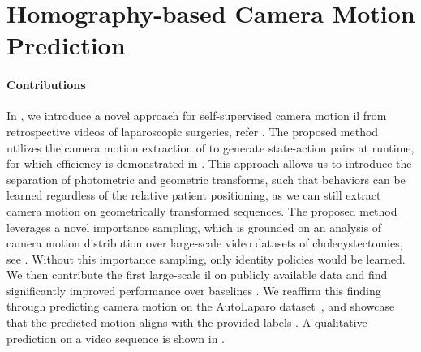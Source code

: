 \section{Homography-based Camera Motion Prediction}
\label{con:sec:hom_pred}
\paragraph{Contributions} In , we introduce a novel approach for self-supervised camera motion \gls{il} from retrospective videos of laparoscopic surgeries, refer . The proposed method utilizes the camera motion extraction of  to generate state-action pairs at runtime, for which efficiency is demonstrated in . This approach allows us to introduce the separation of photometric and geometric transforms, such that behaviors can be learned regardless of the relative patient positioning, as we can still extract camera motion on geometrically transformed sequences. The proposed method leverages a novel importance sampling, which is grounded on an analysis of camera motion distribution over large-scale video datasets of cholecystectomies, see . Without this importance sampling, only identity policies would be learned. We then contribute the first large-scale \gls{il} on publicly available data and find significantly improved performance over baselines . We reaffirm this finding through predicting camera motion on the AutoLaparo dataset~\cite{wang2022autolaparo}, and showcase that the predicted motion aligns with the provided labels . A qualitative prediction on a video sequence is shown in .

